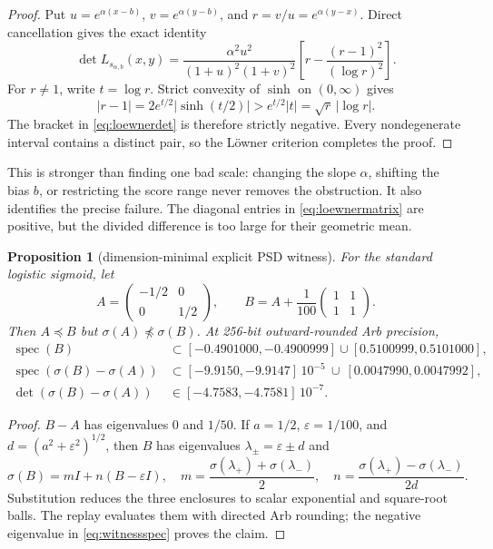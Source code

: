 \documentclass[11pt]{article}
\newtheorem{proposition}[theorem]{Proposition}
\begin{document}
\begin{proof}
Put $u=e^{\alpha(x-b)}$, $v=e^{\alpha(y-b)}$, and $r=v/u=e^{\alpha(y-x)}$.  Direct cancellation gives the exact
identity
\begin{equation}
 \det L_{s_{\alpha,b}}(x,y)
 =\frac{\alpha^2u^2}{(1+u)^2(1+v)^2}
 \left[r-\frac{(r-1)^2}{(\log r)^2}\right].
 \label{eq:loewnerdet}
\end{equation}
For $r\ne1$, write $t=\log r$.  Strict convexity of $\sinh$ on $(0,\infty)$ gives
\[
 |r-1|=2e^{t/2}|\sinh(t/2)|>e^{t/2}|t|=\sqrt r\,|\log r|.
\]
The bracket in \eqref{eq:loewnerdet} is therefore strictly negative.  Every nondegenerate interval contains a
distinct pair, so the L\"owner criterion completes the proof.
\end{proof}

This is stronger than finding one bad scale: changing the slope $\alpha$, shifting the bias $b$, or restricting the
score range never removes the obstruction.  It also identifies the precise failure.  The diagonal entries in
\eqref{eq:loewnermatrix} are positive, but the divided difference is too large for their geometric mean.

\begin{proposition}[dimension-minimal explicit PSD witness]
\label{prop:witness}
For the standard logistic sigmoid, let
\begin{equation}
 A=\begin{pmatrix}-1/2&0\\0&1/2\end{pmatrix},\qquad
 B=A+\frac1{100}\begin{pmatrix}1&1\\1&1\end{pmatrix}.
 \label{eq:witness}
\end{equation}
Then $A\preceq B$ but $\sigma(A)\npreceq\sigma(B)$.  At 256-bit outward-rounded Arb precision,
\begin{align}
 \operatorname{spec}(B)&\subset[-0.4901000,-0.4900999]\cup[0.5100999,0.5101000],\\
 \operatorname{spec}(\sigma(B)-\sigma(A))
 &\subset[-9.9150,-9.9147]\,10^{-5}\ \cup\ [0.0047990,0.0047992],\label{eq:witnessspec}\\
 \det(\sigma(B)-\sigma(A))&\in[-4.7583,-4.7581]\,10^{-7}.
\end{align}
\end{proposition}

\begin{proof}
$B-A$ has eigenvalues $0$ and $1/50$.  If $a=1/2$, $\varepsilon=1/100$, and
$d=(a^2+\varepsilon^2)^{1/2}$, then $B$ has eigenvalues $\lambda_\pm=\varepsilon\pm d$ and
\[
 \sigma(B)=mI+n(B-\varepsilon I),\quad
 m=\frac{\sigma(\lambda_+)+\sigma(\lambda_-)}2,\quad
 n=\frac{\sigma(\lambda_+)-\sigma(\lambda_-)}{2d}.
\]
Substitution reduces the three enclosures to scalar exponential and square-root balls.  The replay evaluates them
with directed Arb rounding; the negative eigenvalue in \eqref{eq:witnessspec} proves the claim.
\end{proof}
\end{document}
